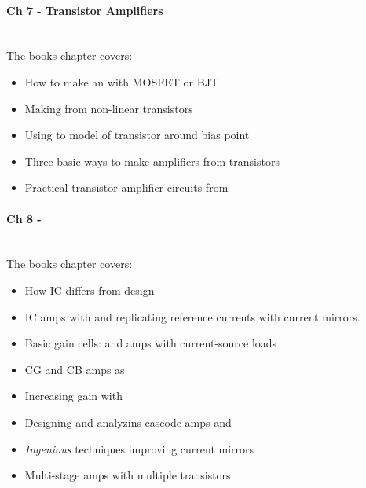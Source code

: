 \paragraph{Ch 7 - Transistor Amplifiers} \hfill \\
The books chapter covers:
\begin{itemize}
  \item How to make an  with MOSFET or BJT
  \item Making  from non-linear transistors
  \item Using  to model
         of transistor around bias point
  \item Three basic ways to make amplifiers from transistors
  \item Practical transistor amplifier circuits from
\end{itemize}

\paragraph{Ch 8 - } \hfill \\
The books chapter covers:
\begin{itemize}
  \item How IC  differs from
         design
  \item {} IC amps with  and
        replicating reference currents with current mirrors.
  \item Basic gain cells:  and  amps with
        current-source loads
  \item CG and CB amps as 
  \item Increasing gain with 
  \item Designing and analyzins cascode amps and
  \item \emph{Ingenious} techniques improving current mirrors
  \item Multi-stage amps with multiple transistors
\end{itemize}

